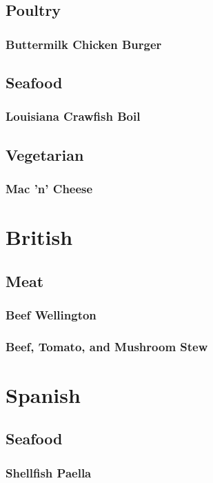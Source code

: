 \documentclass[a4paper]{book}
\begin{document}
\section{Poultry}

\subsection{Buttermilk Chicken Burger}

\section{Seafood}

\subsection{Louisiana Crawfish Boil}

\section{Vegetarian}

\subsection{Mac 'n' Cheese}


\chapter{British}
\section{Meat}
\subsection{Beef Wellington}
\subsection{Beef, Tomato, and Mushroom Stew}

\chapter{Spanish}
\section{Seafood}
\subsection{Shellfish Paella}
\end{document}
